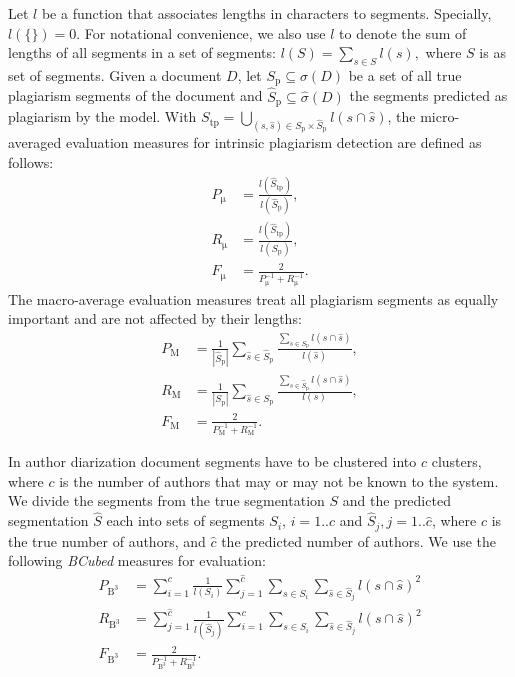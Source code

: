 \documentclass[10pt, a4paper]{article}
\begin{document}
Let $l$ be a function that associates lengths in characters to segments. Specially, $l(\{\}) = 0$. For notational convenience, we also use $l$ to denote the sum of lengths of all segments in a set of segments: $l(S) = \sum_{s\in S} l(s),$ where $S$ is as set of segments. Given a document $D$, let $S_\mathrm{p} \subseteq \sigma(D)$ be a set of all true plagiarism segments of the document and $\hat{S}_\mathrm{p} \subseteq \hat{\sigma}(D)$ the segments predicted as plagiarism by the  model. With ${S_\mathrm{tp} = \bigcup_{(s,\hat{s})\in S_\mathrm{p}\times\hat{S}_\mathrm{p}} l(s\cap\hat{s})}$, the micro-averaged evaluation measures for intrinsic plagiarism detection are defined as follows:
\begin{align}
P_\mathrm{\mu} &= \frac{l(\hat{S}_\mathrm{tp})}{l(\hat{S}_\mathrm{p})}, \\
R_\mathrm{\mu} &= \frac{l(\hat{S}_\mathrm{tp})}{l(S_\mathrm{p})}, \\
F_\mathrm{\mu} &= \frac{2}{P_\mathrm{\mu}^{-1}+R_\mathrm{\mu}^{-1}}.
\end{align}
The macro-average evaluation measures treat all plagiarism segments as equally important and are not affected by their lengths:
\begin{align}
P_\mathrm{M} &= \frac{1}{|\hat{S}_\mathrm{p}|}
	\sum_{\hat{s}\in\hat{S}_\mathrm{p}}
		\frac{{\sum_{s\in S_\mathrm{p}} l(s\cap\hat{s})}}{l(\hat{s})}, \\
R_\mathrm{M} &= \frac{1}{|S_\mathrm{p}|}
	\sum_{\hat{s}\in S_\mathrm{p}}
		\frac{{\sum_{s\in \hat{S}_\mathrm{p}} l(s\cap\hat{s})}}{l(s)}, \\
F_\mathrm{M} &= \frac{2}{P_\mathrm{M}^{-1}+R_\mathrm{M}^{-1}}.
\end{align}

In author diarization document segments have to be clustered into $c$ clusters, where $c$ is the number of authors that may or may not be known to the system. We divide the segments from the true segmentation $S$ and the predicted segmentation $\hat{S}$ each into sets of segments $S_i$, $i=1..c$ and $\hat{S}_j, j=1..\hat{c}$, where $c$ is the true number of authors, and $\hat{c}$ the predicted number of authors. We use the following \emph{BCubed} measures for evaluation:
\begin{align}
P_\mathrm{B^3} &= \sum_{i=1}^c \frac{1}{l(S_i)}\sum_{j=1}^{\hat{c}}
	\sum_{s\in S_i}	\sum_{\hat{s}\in\hat{S}_j} l(s\cap \hat{s})^2 \\
R_\mathrm{B^3} &= \sum_{j=1}^{\hat{c}} \frac{1}{l(\hat{S}_j)}\sum_{i=1}^{c}
	\sum_{s\in S_i}	\sum_{\hat{s}\in\hat{S}_j} l(s\cap \hat{s})^2 \\
F_\mathrm{B^3} &= \frac{2}{P_\mathrm{B^3}^{-1}+R_\mathrm{B^3}^{-1}}.
\end{align}
\end{document}
